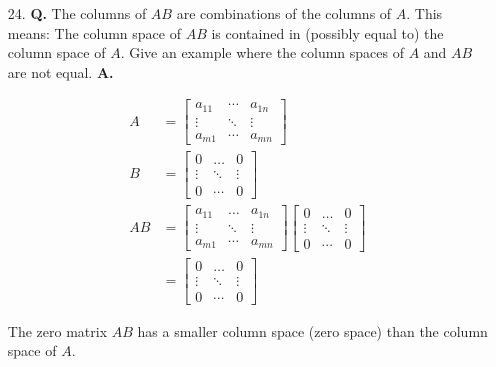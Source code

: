 \documentclass[main.tex]{subfiles}
\begin{document}
\begin{enumerate}
    \item [24.] \textbf{Q.} The columns of $A B$ are combinations of the columns of $A$. This means: The column space of $A B$ is contained in (possibly equal to) the column space of $A$. Give an example where the column spaces of $A$ and $A B$ are not equal. 
    \textbf{A.}
    
    $$
    \begin{aligned}
    A&=\left[\begin{array}{ccc}
    a_{11} & \cdots & a_{1 n} \\
    \vdots & \ddots & \vdots \\
    a_{m 1} & \cdots & a_{m n}
    \end{array}\right]\\
    B&=\left[\begin{array}{ccc}
    0 & \ldots & 0 \\
    \vdots & \ddots & \vdots \\
    0 & \cdots & 0
    \end{array}\right]\\
    A B &=\left[\begin{array}{ccc}
    a_{11} & \ldots & a_{1 n} \\
    \vdots & \ddots & \vdots \\
    a_{m 1} & \cdots & a_{m n}
    \end{array}\right]\left[\begin{array}{ccc}
    0 & \ldots & 0 \\
    \vdots & \ddots & \vdots \\
    0 & \cdots & 0
    \end{array}\right] \\
    &=\left[\begin{array}{ccc}
    0 & \ldots & 0 \\
    \vdots & \ddots & \vdots \\
    0 & \cdots & 0
    \end{array}\right]
    \end{aligned}
    $$
    
     The zero matrix $AB$ has a smaller column space (zero space) than the column space of $A$.
    
\end{enumerate}
\end{document}
